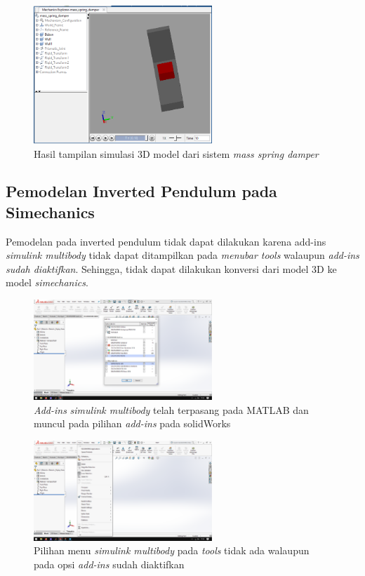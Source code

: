 \documentclass[../main.tex]{subfiles}
\begin{document}
                \begin{figure}[H]
                    \centering
                    \includegraphics[width = 0.6\textwidth]{assets/image/MecahnicExplorer.png}
                    \caption{Hasil tampilan simulasi 3D model dari sistem \textit{mass spring damper}}
                    \label{simulasi_3d_msd}
                \end{figure}
        \subsection{Pemodelan Inverted Pendulum pada Simechanics}
            Pemodelan pada inverted pendulum tidak dapat dilakukan karena add-ins \textit{simulink multibody} tidak dapat ditampilkan pada \textit{menubar tools} walaupun \textit{add-ins sudah diaktifkan}. Sehingga, tidak dapat dilakukan konversi dari model 3D ke model \textit{simechanics}.
            \begin{figure}[H]
                \centering
                \includegraphics[width = 0.6\textwidth]{assets/image/error_add_ins.png}
                \caption{\textit{Add-ins} \textit{simulink multibody} telah terpasang pada MATLAB dan muncul pada pilihan \textit{add-ins} pada solidWorks}
                \label{error_add_ins}
            \end{figure}
            \begin{figure}[H]
                \centering
                \includegraphics[width = 0.6\textwidth]{assets/image/error_menubar_tools.png}
                \caption{Pilihan menu \textit{simulink multibody} pada \textit{tools} tidak ada walaupun pada opsi \textit{add-ins} sudah diaktifkan}
                \label{error_menu}
            \end{figure}
\end{document}
